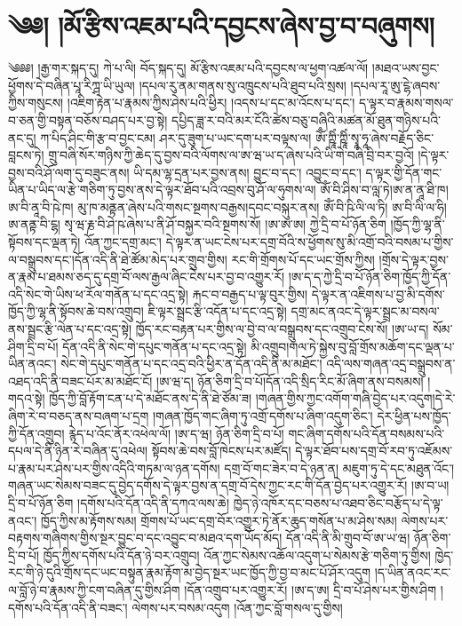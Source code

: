 \setcounter{footnote}{0} 
\chapter{༄༅། །མོ་རྩིས་འཇམ་པའི་དབྱངས་ཞེས་བྱ་བ་བཞུགས།}༄༅༅། །རྒྱ་གར་སྐད་དུ། ཀེ་པ་ལི། བོད་སྐད་དུ། མོ་རྩིས་འཇམ་པའི་དབྱངས་ལ་ཕྱག་འཚལ་ལོ། །མཐའ་ཡས་བྱང་ཕྱོགས་དེ་བཞིན་པཱ་རིཀྴ་ཡི་ཡུལ། །དཔལ་རུ་ནམ་གནས་སུ་འཁྲུངས་པའི་ཐུབ་པའི་སྲས། །དཔལ་རཱ་ཨུ་ངྷེ་ཞབས་ཀྱིས་གསུངས། །འཇིག་རྟེན་པ་རྣམས་ཀྱིས་ཤེས་པའི་ཕྱིར། །འདས་པ་དང་མ་འོངས་པ་དང་། ད་ལྟར་བ་རྣམས་གསལ་བ་ཅན་གྱི་བསྟན་བཅོས་བཤད་པར་བྱ་སྟེ། དཔྱིད་ཟླ་ར་བའི་མར་ངོའི་ཚེས་བཅུ་བཞིའི་མཚན་མོ་ཐུན་གཉིས་པའི་ནང་དུ། ཀ་པིད་ཤིང་གི་རྩ་བ་བྱང་ངམ། ཤར་དུ་ཟུག་པ་ཡང་དག་པར་བལྟས་ལ། ཨོྃ་ཀྵཱིཾ་ཀྵཱིཾ་སྭཱ་ཧཱ་ཞེས་བརྗོད་ཅིང་བླངས་ཏེ། གྲུ་བཞི་སོར་གཉིས་ཀྱི་ཆེད་དུ་བྱས་བའི་ལོགས་ལ་ཨ་ཝ་ཡ་ད་ཞེས་པའི་ཡི་གེ་བཞི་བྲི་བར་བྱའོ། །དེ་ལྟར་བྱས་བའི་ཤོ་ལག་དུ་བཟུང་ནས། ཡི་དམ་ལྷ་དྲན་པར་བྱས་ནས། བྱུང་བ་དང་། འབྱུང་བ་དང་། ད་ལྟར་གྱི་དོན་གང་ཡིན་པ་ཡིད་ལ་རྩེ་གཅིག་ཏུ་བྱས་ནས་དེ་ལྟར་ཐོབ་པའི་འབྲས་བུ་ཤོ་ལ་ཧུགས་ལ། ཨོཾ་བི་ཤིས་བ་ལླ་ཏེ།ཨ་ན་ནཱ་ཐི་ཁ། ཨ་བི་ནཱ་བི་ཥེ་ཁ། མུ་ཁ་མནྟན་ཞེས་པའི་གསང་སྔགས་བརྒྱས།དབང་བསྐུར་ནས། ཨོཾ་བི་ཥི་ལི་ལ་ཏི། ཨ་བི་ལི་ལ་ཧི། ཨ་ནནྟ་བི་ངྷ། སྭ་ཝ་རྞ་བི་ཤེ་ཥ་ཞེས་པ་ནི་ཤོ་བསྐྱར་བའི་སྔགས་སོ། །ཨ་ཨ་ཨ། ཀྱེ་དྲི་བ་པོ་ཉོན་ཅིག །ཁྱོད་ཀྱི་ལྷ་ནི་སྟོབས་དང་ལྡན་ཏེ། འོན་ཀྱང་དགྲ་མང་། དེ་ལྟར་ན་ཡང་ངེས་པར་དགྲ་བོའི་ས་ཕྱོགས་སུ་མི་འགྲོ་བའི་བསམ་པ་གྱིས་ལ་བསྒྲུབས་དང་།དོན་འདི་ནི་ཐེ་ཚོམ་མེད་པར་གྲུབ་གྱིས། རང་གི་གྲོགས་པོ་དང་ཡང་གྲོས་ཀྱིས། །གྲོས་དེ་ལྟར་བྱས་ན་རྣམ་པ་ཐམས་ཅད་དུ་དགྲ་བོ་ལས་རྒྱལ་ཞིང་ངེས་པར་བྱ་བ་འགྱུར་རོ། །ཨ་ད་ད་ཀྱེ་དྲི་བ་པོ་ཉོན་ཅིག་ཁྱོད་ཀྱི་དོན་འདི་སེང་གེ་ཡིས་ཕ་རོལ་གནོན་པ་དང་འདྲ་སྟེ། རྐང་བ་བརྒྱད་པ་ལྟ་བུར་གྱིས། དེ་ལྟར་ན་འཇིགས་པ་བྱ་མི་དགོས་ཁྱོད་ཀྱི་ལྷ་ནི་སྟོབས་ཆེ་བས་འགྲུབ། ཇི་ལྟར་སྦྲང་རྩི་འདོན་པ་དང་འདྲ་སྟེ། དགྲ་མང་ནའང་དེ་ལྟར་སྦྲང་མ་བསལ་ནས་སྦྲང་རྩི་ལེན་པ་དང་འདྲ་སྟེ། ཁྱོད་རང་བརྟན་པར་གྱིས་ལ་བྱེ་བ་ལ་བསྒྲུབས་དང་འགྲུབ་ངེས་སོ། །ཨ་ཡ་ད། སོམ་ཤིག་དྲི་བ་པོ། དོན་འདི་ནི་སེང་གེ་དཔུང་གནོན་པ་དང་འདྲ་སྟེ། མི་འགྲུབ།གལ་ཏེ་སྐྱེས་བུ་བློ་གྲོས་མཆོག་དང་ལྡན་པ་ཡིན་ནའང་། སེང་གེ་དཔུང་གནོན་པ་དང་འདྲ་བའི་ཕྱིར་ན་དོན་འདི་ནི་མ་མཐོང་། འདི་ལས་གཞན་འདྲ་བསྒྲུབས་ན་འཐད་འདི་ནི་བཟང་པོར་མ་མཐོང་ངོ། །ཨ་ཝ་ད། ཉོན་ཅིག་དྲི་བ་པོ།དོན་འདི་སྲིད་རིང་མོ་ཞིག་ནས་བསམས། །གདའ་སྟེ། ཁྱོད་ཀྱི་བློ་རྟོག་ངན་པ་དེ་མཐོང་ནས་དེ་ནི་ཐེ་ཙོམ་ཟ། །གཞན་གྱིས་ཀྱང་འགོག་གཞི་བྱེད་པར་འདུག།དེ་རེ་ཞིག་རེ་བ་བཅད་ནས་བཞག་པ་དྲག །གཞན་ཁྱོད་གང་ཞིག་ཏུ་འགྲོ་དགོས་པ་ཞིག་འདུག་ཅིང་། དེར་ཕྱིན་པས་ཁྱོད་ཀྱི་དོན་འགྲུབ། རྙེད་པ་འོང་ནོར་འཕེལ་ལོ། །ཨ་ད་ཝ། ཉོན་ཅིག་དྲི་བ་པོ། གང་ཞིག་དགོས་པའི་དོན་བསམས་པའི་དཔལ་དེ་ནི་ཉིན་རེ་བཞིན་དུ་འཕེལ། སྟོབས་ཆེ་བས་བློ་ཁེངས་པར་མཛོད། དེ་ལྟར་ཐོབ་པས་དགྲ་བོ་རབ་ཏུ་འཇོམས་པ་རྣམ་པར་ཤེས་པར་གྱིས་འདིའི་གཏམ་ལ་ཉན་དགོས། དགྲ་བོ་གང་ཟེར་བ་དེ་ཉན་ན། མཇུག་ཏུ་དེ་དང་མཐུན་འོང་། གཞན་ཡང་སེམས་བཟང་དུ་བྱེད་དགོས་དེ་ལྟར་བྱས་ན་དགྲ་བོ་དེས་ཀྱང་རང་གི་དོན་བྱེད་པར་འགྱུར་རོ། །ཨ་བ་ཡ། དྲི་བ་པོ་ཉོན་ཅིག །དགོས་པའི་དོན་འདི་ནི་དཀའ་ལས་ཆེ། ཁྱེད་ཉེ་འཁོར་དང་བཅས་པ་འཐབ་ཅིང་བརྩོད་པ་དེ་ལྟ་ནའང་། ཁྱོད་ཀྱིས་མ་རྟོགས་སམ། གྲོགས་པོ་ཡང་དགྲ་བོར་འགྱུར་ཏེ་ནོར་ཆུད་གསོན་པ་མ་ཤེས་སམ། ལེགས་པར་བརྟགས་གཞིགས་གྱིས་སྔར་བྱུང་བ་དང་འབྱུང་བ་མཐའ་དག་ཡོད་མོད། དོན་འདི་ནི་མི་གྲུབ་བོ་ཨ་ཡ་ཝ། ཉོན་ཅིག་དྲི་བ་པོ། ཁྱོད་ཀྱིས་དགོས་པའི་དོན་ཉེ་བར་འགྲུབ། འོན་ཀྱང་སེམས་འཆོལ་འདུག་པ་སེམས་རྩེ་གཅིག་ཏུ་གྱིས། ཁྱེད་རང་གི་ཉེ་དུའི་གྲོས་དང་ཡང་བསྟུན་རྣམ་རྟོག་མ་བྱེད་སྔར་ཡང་ཁྱོད་ཀྱི་བྱ་བ་མང་པོ་ཤོར་འདུག །ད་ཡིན་ནའང་རང་ལ་བློ་ཉེ་བ་རྣམས་ཀྱི་ངག་བཞིན་དུ་གྱིས་ཤིག །དོན་འགྲུབ་པར་འགྱུར་རོ། །ཨ་ད་ཨ། དྲི་བ་པོ་ཤེས་པར་གྱིས་ཤིག །དགོས་པའི་དོན་འདི་ནི་བཟང་། ལེགས་པར་བསམ་འདུག །འོན་ཀྱང་བློ་གསལ་དུ་གྱིས། 
